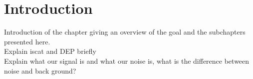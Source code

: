 \section{Introduction}
Introduction of the chapter giving an overview of the goal and the subchapters presented here.\\
Explain \gls{iscat} and \gls{DEP} briefly\\
Explain what our signal is and what our noise is, what is the difference between noise and back ground?\\
